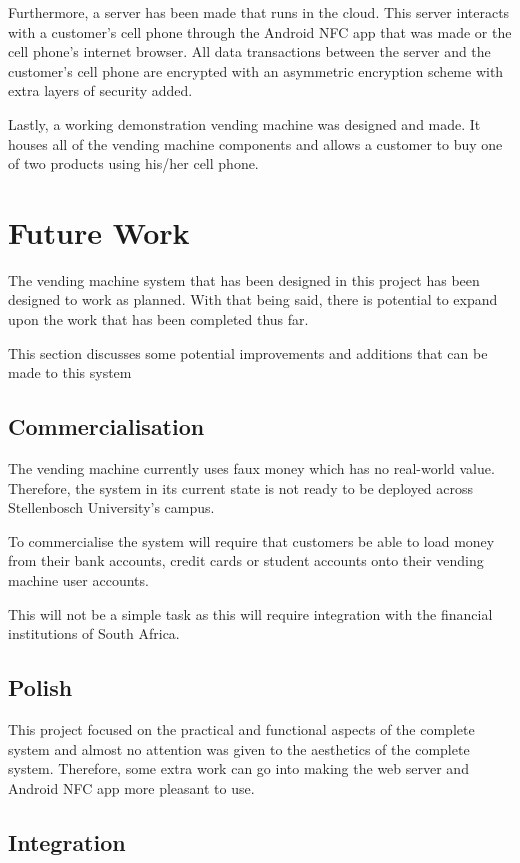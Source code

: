Furthermore, a server has been made that runs in the cloud. This server interacts with a
customer's cell phone through the Android NFC app that was made or the cell phone's
internet browser. All data transactions between the server and the customer's cell phone
are encrypted with an asymmetric encryption scheme with extra layers of security added.

Lastly, a working demonstration vending machine was designed and made. It houses all of
the vending machine components and allows a customer to buy one of two products using
his/her cell phone. 

\section{Future Work}

The vending machine system that has been designed in this project has been designed to
work as planned. With that being said, there is potential to expand upon the work that has
been completed thus far.

This section discusses some potential improvements and additions that can be made to this
system

\subsection{Commercialisation}

The vending machine currently uses faux money which has no real-world value. Therefore,
the system in its current state is not ready to be deployed across Stellenbosch
University's campus. 

To commercialise the system will require that customers be able to load money
from their bank accounts, credit cards or student accounts onto their vending machine user
accounts. 

This will not be a simple task as this will require integration with the financial
institutions of South Africa. 

\subsection{Polish}

This project focused on the practical and functional aspects of the complete system and
almost no attention was given to the aesthetics of the complete system. Therefore, some
extra work can go into making the web server and Android NFC app more pleasant to use. 

\subsection{Integration}

